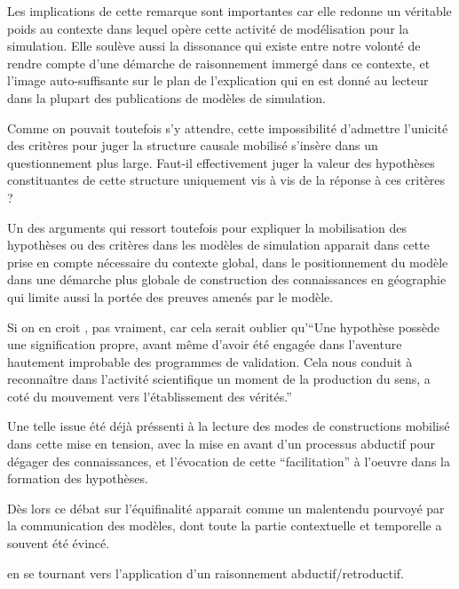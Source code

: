 Les implications de cette remarque sont importantes car elle redonne un véritable poids au contexte dans lequel opère cette activité de modélisation pour la simulation. Elle soulève aussi la dissonance qui existe entre notre volonté de rendre compte d'une démarche de raisonnement immergé dans ce contexte, et l'image auto-suffisante sur le plan de l'explication qui en est donné au lecteur dans la plupart des publications de modèles de simulation. 


Comme on pouvait toutefois s'y attendre, cette impossibilité d'admettre l'unicité des critères pour juger la structure causale mobilisé s'insère dans un questionnement plus large. Faut-il effectivement juger la valeur des hypothèses constituantes de cette structure uniquement vis à vis de la réponse à ces critères ?

Un des arguments qui ressort toutefois pour expliquer la mobilisation des hypothèses ou des critères dans les modèles de simulation apparait dans cette prise en compte nécessaire du contexte global, dans le positionnement du modèle dans une démarche plus globale de construction des connaissances en géographie qui limite aussi la portée des preuves amenés par le modèle.


Si on en croit \textcite[17]{Besse2000}, pas vraiment, car cela serait oublier qu'\enquote{Une hypothèse possède une signification propre, avant même d’avoir été engagée dans l’aventure hautement improbable des programmes de validation. Cela nous conduit à reconnaître dans l’activité scientifique un moment de la production du sens, a coté du mouvement vers l’établissement des vérités.}


Une telle issue été déjà préssenti à la lecture des modes de constructions mobilisé dans cette mise en tension, avec la mise en avant d'un processus abductif pour dégager des connaissances, et l'évocation de cette \enquote{facilitation} à l'oeuvre dans la formation des hypothèses. 

Dès lors ce débat sur l'équifinalité apparait comme un malentendu pourvoyé par la communication des modèles, dont toute la partie contextuelle et temporelle a souvent été évincé.

en se tournant vers l'application d'un raisonnement abductif/retroductif.

















